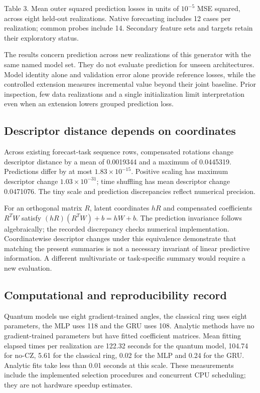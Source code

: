 \documentclass[
  11pt,
]{article}
\begin{document}
Table 3. Mean outer squared prediction losses in units of \(10^{-5}\)
MSE squared, across eight held-out realizations. Native forecasting
includes 12 cases per realization; common probes include 14. Secondary
feature sets and targets retain their exploratory status.

The results concern prediction across new realizations of this generator
with the same named model set. They do not evaluate prediction for
unseen architectures. Model identity alone and validation error alone
provide reference losses, while the controlled extension measures
incremental value beyond their joint baseline. Prior inspection, few
data realizations and a single initialization limit interpretation even
when an extension lowers grouped prediction loss.

\hypertarget{descriptor-distance-depends-on-coordinates}{%
\subsection{Descriptor distance depends on
coordinates}\label{descriptor-distance-depends-on-coordinates}}

Across existing forecast-task sequence rows, compensated rotations
change descriptor distance by a mean of 0.0019344 and a maximum of
0.0445319. Predictions differ by at most \(1.83\times10^{-15}\).
Positive scaling has maximum descriptor change \(1.03\times10^{-31}\);
time shuffling has mean descriptor change 0.0471076. The tiny scale and
prediction discrepancies reflect numerical precision.

For an orthogonal matrix \(R\), latent coordinates \(hR\) and
compensated coefficients \(R^TW\) satisfy \((hR)(R^TW)+b=hW+b\). The
prediction invariance follows algebraically; the recorded discrepancy
checks numerical implementation. Coordinatewise descriptor changes under
this equivalence demonstrate that matching the present summaries is not
a necessary invariant of linear predictive information. A different
multivariate or task-specific summary would require a new evaluation.

\hypertarget{computational-and-reproducibility-record}{%
\subsection{Computational and reproducibility
record}\label{computational-and-reproducibility-record}}

Quantum models use eight gradient-trained angles, the classical ring
uses eight parameters, the MLP uses 118 and the GRU uses 108. Analytic
methods have no gradient-trained parameters but have fitted coefficient
matrices. Mean fitting elapsed times per realization are 122.32 seconds
for the quantum model, 104.74 for no-CZ, 5.61 for the classical ring,
0.02 for the MLP and 0.24 for the GRU. Analytic fits take less than 0.01
seconds at this scale. These measurements include the implemented
selection procedures and concurrent CPU scheduling; they are not
hardware speedup estimates.
\end{document}
